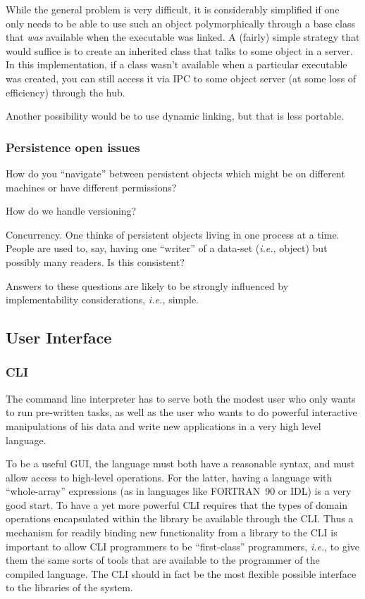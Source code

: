 While the general problem is very difficult, it is considerably
simplified if one only needs to be able to use such an object
polymorphically through a base class that {\em was} available when the
executable was linked. A (fairly) simple strategy that would suffice
is to create an inherited class that talks to some object in a
server. In this implementation, if a class wasn't available when a
particular executable was created, you can still access it via IPC to
some object server (at some loss of efficiency) through the hub.

Another possibility would be to use dynamic linking, but that is less
portable. 
\subsubsection{Persistence open issues}
How do you ``navigate'' between persistent objects which might be on
different machines or have different permissions?

How do we handle versioning?

Concurrency. One thinks of persistent objects living in one process at
a time. People are used to, say, having one ``writer'' of a data-set
({\em i.e.}, object) but possibly many readers. Is this consistent?

Answers to these questions are likely to be strongly influenced by
implementability considerations, {\em i.e.,} simple.

\subsection{User Interface}
\subsubsection{CLI}

The command line interpreter has to serve both the modest user who
only wants to run pre-written tasks, as well as the user who wants to
do powerful interactive manipulations of his data and write new
applications in a very high level language.

To be a useful GUI, the language must both have a reasonable syntax,
and must allow access to high-level operations. For the latter, having
a language with ``whole-array'' expressions (as in languages like
FORTRAN~90 or IDL) is a very good start. To have a yet more powerful
CLI requires that the types of domain operations encapsulated within
the library be available through the CLI. Thus a mechanism for
readily binding new functionality from a library to the CLI is
important to allow CLI programmers to be ``first-class'' programmers,
{\em i.e.}, to give them the same sorts of tools that are available to
the programmer of the compiled language. The CLI should in fact be the
most flexible possible interface to the libraries of the system.


